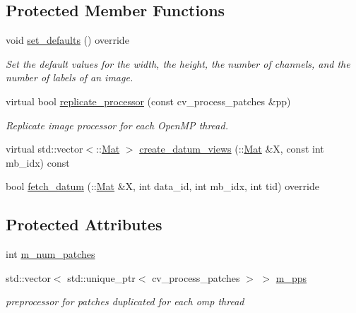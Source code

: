\subsection*{Protected Member Functions}
\begin{DoxyCompactItemize}
\item 
void \hyperlink{classlbann_1_1imagenet__reader__patches_a3458e4274b9ed894973a069cf884f04a}{set\+\_\+defaults} () override
\begin{DoxyCompactList}\small\item\em Set the default values for the width, the height, the number of channels, and the number of labels of an image. \end{DoxyCompactList}\item 
virtual bool \hyperlink{classlbann_1_1imagenet__reader__patches_a714247cc547161688a66a64737527de0}{replicate\+\_\+processor} (const cv\+\_\+process\+\_\+patches \&pp)
\begin{DoxyCompactList}\small\item\em Replicate image processor for each Open\+MP thread. \end{DoxyCompactList}\item 
virtual std\+::vector$<$\+::\hyperlink{base_8hpp_a68f11fdc31b62516cb310831bbe54d73}{Mat} $>$ \hyperlink{classlbann_1_1imagenet__reader__patches_a920f235bde95d5c3e8ae97c389c9d953}{create\+\_\+datum\+\_\+views} (\+::\hyperlink{base_8hpp_a68f11fdc31b62516cb310831bbe54d73}{Mat} \&X, const int mb\+\_\+idx) const
\item 
bool \hyperlink{classlbann_1_1imagenet__reader__patches_a8a9e4a1339f2e9676a0e653853ebff3c}{fetch\+\_\+datum} (\+::\hyperlink{base_8hpp_a68f11fdc31b62516cb310831bbe54d73}{Mat} \&X, int data\+\_\+id, int mb\+\_\+idx, int tid) override
\end{DoxyCompactItemize}
\subsection*{Protected Attributes}
\begin{DoxyCompactItemize}
\item 
int \hyperlink{classlbann_1_1imagenet__reader__patches_a3380936d3d01d5efc77f0f129891fc65}{m\+\_\+num\+\_\+patches}
\item 
std\+::vector$<$ std\+::unique\+\_\+ptr$<$ cv\+\_\+process\+\_\+patches $>$ $>$ \hyperlink{classlbann_1_1imagenet__reader__patches_a76a4c760b0430ce6df990b9e3bd33fef}{m\+\_\+pps}
\begin{DoxyCompactList}\small\item\em preprocessor for patches duplicated for each omp thread \end{DoxyCompactList}\end{DoxyCompactItemize}
